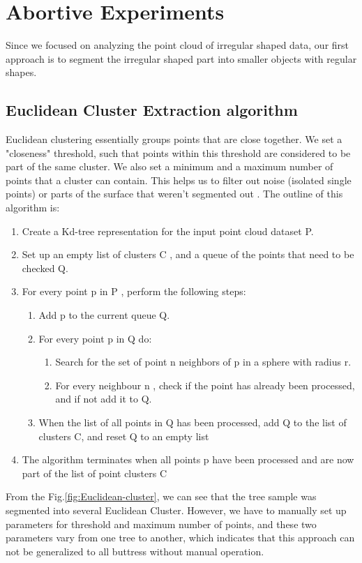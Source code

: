 \documentclass[runningheads,a4paper]{llncs}
\begin{document}
\section{Abortive Experiments}
Since we focused on analyzing the point cloud of irregular shaped data, our first approach is to segment the irregular shaped part into smaller objects with regular shapes. 
\subsection{Euclidean Cluster Extraction algorithm}
Euclidean clustering essentially groups points that are close together. We set a "closeness" threshold, such that points within this threshold are considered to be part of the same cluster. We also set a minimum and a maximum number of points that a cluster can contain. This helps us to filter out noise (isolated single points) or parts of the surface that weren't segmented out \cite{6}. The outline of this algorithm is:
\begin{enumerate}
\item Create a Kd-tree representation for the input point cloud dataset P.
\item Set up an empty list of clusters C , and a queue of the points that need to be checked Q.
\item For every point p in P , perform the following steps:
\begin{enumerate}
\item Add p to the current queue Q.
\item	For every point p in Q do:
\begin{enumerate}
\item Search for the set of point n neighbors of p in a sphere with radius r.
\item For every neighbour n , check if the point has already been processed, and if not add it to Q.
\end{enumerate}
\item When the list of all points in Q has been processed, add Q to the list of clusters C, and reset Q to an empty list
\end{enumerate}
\item The algorithm terminates when all points p have been processed and are now part of the list of point clusters C
\end{enumerate}

From the Fig.\ref{fig:Euclidean-cluster}, we can see that the tree sample was segmented into several Euclidean Cluster. However, we have to manually set up parameters for threshold and maximum number of points, and these two parameters vary from one tree to another, which indicates that this approach can not be generalized to all buttress without manual operation. 
\end{document}
